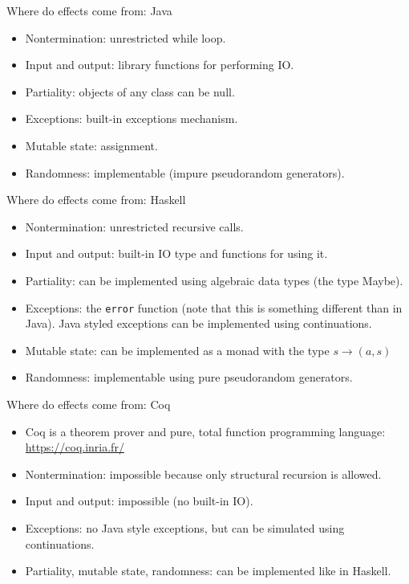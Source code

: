\documentclass{beamer}
\begin{document}
\begin{frame}{Where do effects come from: Java}
\begin{itemize}
	\item Nontermination: unrestricted while loop.
	\item Input and output: library functions for performing IO.
	\item Partiality: objects of any class can be null.
	\item Exceptions: built-in exceptions mechanism.
	\item Mutable state: assignment.
	\item Randomness: implementable (impure pseudorandom generators).
\end{itemize}
\end{frame}

\begin{frame}{Where do effects come from: Haskell}
\begin{itemize}
	\item Nontermination: unrestricted recursive calls.
	\item Input and output: built-in IO type and functions for using it.
	\item Partiality: can be implemented using algebraic data types (the type Maybe).
	\item Exceptions: the \texttt{error} function (note that this is something different than in Java). Java styled exceptions can be implemented using continuations.
	\item Mutable state: can be implemented as a monad with the type $s \to (a, s)$
	\item Randomness: implementable using pure pseudorandom generators.
\end{itemize}
\end{frame}

\begin{frame}{Where do effects come from: Coq}
\begin{itemize}
	\item Coq is a theorem prover and pure, total function programming language: \href{https://coq.inria.fr/}{https://coq.inria.fr/}
	\item Nontermination: impossible because only structural recursion is allowed.
	\item Input and output: impossible (no built-in IO).
	\item Exceptions: no Java style exceptions, but can be simulated using continuations.
	\item Partiality, mutable state, randomness: can be implemented like in Haskell.
\end{itemize}
\end{frame}
\end{document}
